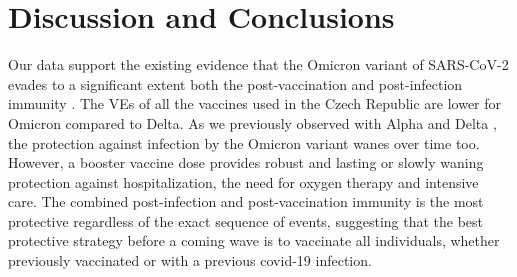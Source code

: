 \documentclass[9pt,twocolumn,twoside,lineno]{pnas-new}
\begin{document}



\section*{Discussion and Conclusions}
\label{sec4}

Our data support the existing evidence that the Omicron variant of SARS-CoV-2 evades to a significant extent both the post-vaccination and post-infection immunity \citep{mccallum2022,Dejnirattisai2022,Hoffmann2022,Cui2022,Cao2021}. The VEs of all the vaccines used in the Czech Republic are lower for Omicron compared to Delta. As we previously observed with Alpha and Delta \citep{Berec2021preprint}, the protection against infection by the Omicron variant wanes over time too. However, a booster vaccine dose provides robust and lasting or slowly waning protection against hospitalization, the need for oxygen therapy and intensive care. The combined post-infection and post-vaccination immunity is the most protective regardless of the exact sequence of events, suggesting that the best protective strategy before a coming wave is to vaccinate all individuals, whether previously vaccinated or with a previous covid-19 infection.
\end{document}
